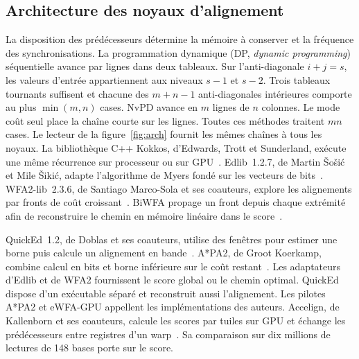 
\subsection{Architecture des noyaux d’alignement}
La disposition des prédécesseurs détermine la mémoire à conserver et la fréquence des synchronisations. La programmation dynamique (DP, \emph{dynamic programming}) séquentielle avance par lignes dans deux tableaux. Sur l'anti-diagonale \(i+j=s\), les valeurs d'entrée appartiennent aux niveaux \(s-1\) et \(s-2\). Trois tableaux tournants suffisent et chacune des \(m+n-1\) anti-diagonales intérieures comporte au plus \(\min(m,n)\) cases. NvPD avance en \(m\) lignes de \(n\) colonnes. Le mode coût seul place la chaîne courte sur les lignes. Toutes ces méthodes traitent \(mn\) cases.
Le lecteur de la figure~\ref{fig:arch} fournit les mêmes chaînes à tous les noyaux. La bibliothèque C++ Kokkos, d’Edwards, Trott et Sunderland, exécute une même récurrence sur processeur ou sur GPU~\cite{kokkos}. Edlib~1.2.7, de Martin Šošić et Mile Šikić, adapte l’algorithme de Myers fondé sur les vecteurs de bits~\cite{edlib,myers,edlibcode}. WFA2-lib~2.3.6, de Santiago Marco-Sola et ses coauteurs, explore les alignements par fronts de coût croissant~\cite{wfa,wfa2code}. BiWFA propage un front depuis chaque extrémité afin de reconstruire le chemin en mémoire linéaire dans le score~\cite{biwfa}.

QuickEd~1.2, de Doblas et ses coauteurs, utilise des fenêtres pour estimer une borne puis calcule un alignement en bande~\cite{quicked,quickedcode}. A*PA2, de Groot Koerkamp, combine calcul en bits et borne inférieure sur le coût restant~\cite{astar,astarcode}. Les adaptateurs d’Edlib et de WFA2 fournissent le score global ou le chemin optimal. QuickEd dispose d'un exécutable séparé et reconstruit aussi l'alignement. Les pilotes A*PA2 et eWFA-GPU appellent les implémentations des auteurs. Accelign, de Kallenborn et ses coauteurs, calcule les scores par tuiles sur GPU et échange les prédécesseurs entre registres d'un warp~\cite{accelign}. Sa comparaison sur dix millions de lectures de 148 bases porte sur le score.

